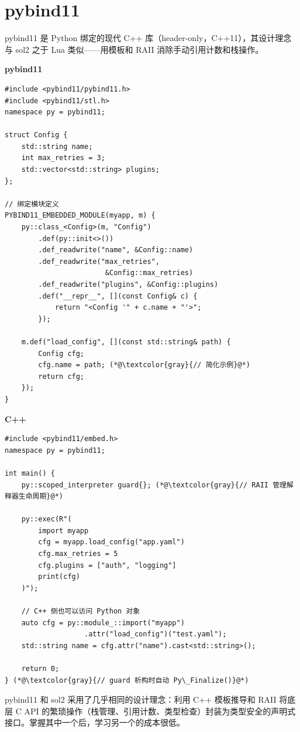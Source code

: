 \documentclass[12pt,a4paper,fontset=fandol]{ctexbook}
\newenvironment{bestpractice}[1][]{%
  \begin{tcolorbox}[enhanced,breakable,
    colback=purple!5!white,colframe=purple!60!black,
    boxed title style={colback=purple!60!black},
    attach boxed title to top left={yshift=-2mm,xshift=2mm},
    arc=2mm,boxrule=0.8mm,
    title={最佳实践},#1]}%
  {\end{tcolorbox}}
\newcommand{\cpplabel}{%
  \noindent\begin{tcolorbox}[colback=algheadbg,coltext=white,
    sharp corners,boxrule=0pt,width=3.0em,height=1.4em,
    halign=center,valign=center,nobeforeafter,left=0pt,right=0pt,
    top=0pt,bottom=0pt]\small\bfseries C++\end{tcolorbox}}
\newcommand{\pybindlabel}{%
  \noindent\begin{tcolorbox}[colback=pythonheadbg!80!black,coltext=white,
    sharp corners,boxrule=0pt,width=5.0em,height=1.4em,
    halign=center,valign=center,nobeforeafter,left=0pt,right=0pt,
    top=0pt,bottom=0pt]\small\bfseries pybind11\end{tcolorbox}}
\begin{document}
\section{pybind11}\label{sec:pybind11}

pybind11 是 Python 绑定的现代 C++ 库（header-only，C++11），其设计理念与 sol2 之于 Lua 类似——用模板和 RAII 消除手动引用计数和栈操作。

\pybindlabel
\begin{lstlisting}[style=cppstyle]
#include <pybind11/pybind11.h>
#include <pybind11/stl.h>
namespace py = pybind11;

struct Config {
    std::string name;
    int max_retries = 3;
    std::vector<std::string> plugins;
};

// 绑定模块定义
PYBIND11_EMBEDDED_MODULE(myapp, m) {
    py::class_<Config>(m, "Config")
        .def(py::init<>())
        .def_readwrite("name", &Config::name)
        .def_readwrite("max_retries",
                        &Config::max_retries)
        .def_readwrite("plugins", &Config::plugins)
        .def("__repr__", [](const Config& c) {
            return "<Config '" + c.name + "'>";
        });

    m.def("load_config", [](const std::string& path) {
        Config cfg;
        cfg.name = path; (*@\textcolor{gray}{// 简化示例}@*)
        return cfg;
    });
}
\end{lstlisting}

\cpplabel
\begin{lstlisting}[style=cppstyle]
#include <pybind11/embed.h>
namespace py = pybind11;

int main() {
    py::scoped_interpreter guard{}; (*@\textcolor{gray}{// RAII 管理解释器生命周期}@*)

    py::exec(R"(
        import myapp
        cfg = myapp.load_config("app.yaml")
        cfg.max_retries = 5
        cfg.plugins = ["auth", "logging"]
        print(cfg)
    )");

    // C++ 侧也可以访问 Python 对象
    auto cfg = py::module_::import("myapp")
                   .attr("load_config")("test.yaml");
    std::string name = cfg.attr("name").cast<std::string>();

    return 0;
} (*@\textcolor{gray}{// guard 析构时自动 Py\_Finalize()}@*)
\end{lstlisting}

\begin{bestpractice}[title={pybind11 与 sol2 的相似性}]
pybind11 和 sol2 采用了几乎相同的设计理念：利用 C++ 模板推导和 RAII 将底层 C API 的繁琐操作（栈管理、引用计数、类型检查）封装为类型安全的声明式接口。掌握其中一个后，学习另一个的成本很低。
\end{bestpractice}
\end{document}
